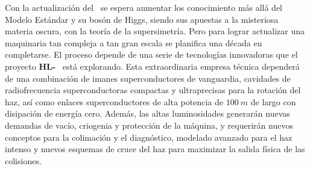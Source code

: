 Con la actualización del \LHC ~se espera aumentar los conocimiento más allá del Modelo Estándar y su bosón de Higgs, siendo sus apuestas a la misteriosa materia oscura, con la teoría de la supersimetría. Pero para lograr actualizar una maquinaria tan compleja a tan gran escala se planifica una década en completarse. El proceso depende de una serie de tecnologías innovadoras que el proyecto \textbf{HL-}\LHC ~ está explorando. Esta extraordinaria empresa técnica dependerá de una combinación de imanes superconductores de vanguardia, cavidades de radiofrecuencia superconductoras compactas y ultraprecisas para la rotación del haz, así como enlaces superconductores de alta potencia de $100 ~m$ de largo con disipación de energía cero. Además, las altas luminosidades generarán nuevas demandas de vacío, criogenia y protección de la máquina, y requerirán nuevos conceptos para la colimación y el diagnóstico, modelado avanzado para el haz intenso y nuevos esquemas de cruce del haz para maximizar la salida física de las colisiones.




